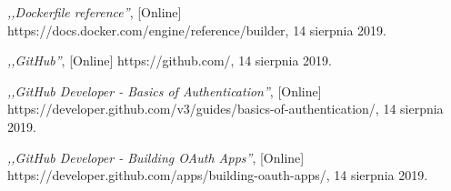 \begin{thebibliography}{99}
  \emph{,,Dockerfile reference''}, [Online] https://docs.docker.com/engine/reference/builder, 14 sierpnia 2019.

 \emph{,,GitHub''}, [Online] https://github.com/, 14 sierpnia 2019.

 \emph{,,GitHub Developer - Basics of Authentication''}, [Online] https://developer.github.com/v3/guides/basics-of-authentication/, 14 sierpnia 2019.

 \emph{,,GitHub Developer - Building OAuth Apps''}, [Online] https://developer.github.com/apps/building-oauth-apps/, 14 sierpnia 2019.

\end{thebibliography}
\clearpage




